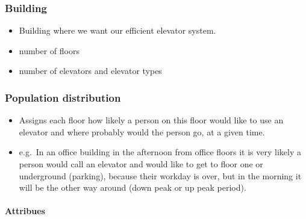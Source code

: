 \hypertarget{building}{%
\subsubsection{\texorpdfstring{\textbf{Building}}{Building}}\label{building}}

\begin{itemize}
\item
  Building where we want our efficient elevator system.
\item
  number of floors
\item
  number of elevators and elevator types
\end{itemize}

\hypertarget{population-distribution}{%
\subsubsection{\texorpdfstring{\textbf{Population
distribution}}{Population distribution}}\label{population-distribution}}

\begin{itemize}
\tightlist
\item
  Assigns each floor how likely a person on this floor would like to use
  an elevator and where probably would the person go, at a given time.
\item
  e.g.~In an office building in the afternoon from office floors it is
  very likely a person would call an elevator and would like to get to
  floor one or underground (parking), because their workday is over, but
  in the morning it will be the other way around (down peak or up peak
  period).
\end{itemize}

\hypertarget{attribues}{%
\paragraph{Attribues}\label{attribues}}

